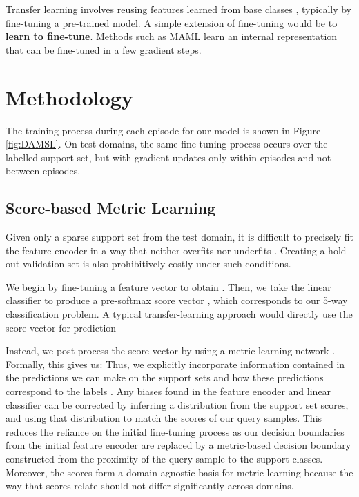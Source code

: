 \documentclass[final]{cvpr}
\begin{document}
Transfer learning involves reusing features learned from base classes \cite{pan2009survey}, typically by fine-tuning a pre-trained model. A simple extension of fine-tuning would be to \textbf{learn to fine-tune}. Methods such as MAML \cite{finn2017model} learn an internal representation that can be fine-tuned in a few gradient steps. 





\section{Methodology}

The training process during each episode for our model is shown in Figure \ref{fig:DAMSL}. On test domains, the same fine-tuning process occurs over the labelled support set, but with gradient updates only within episodes and not between episodes.

\subsection{Score-based Metric Learning}

Given only a sparse support set from the test domain, it is difficult to precisely fit the feature encoder in a way that neither overfits nor underfits \cite{nakamura2019revisiting}. Creating a hold-out validation set is also prohibitively costly under such conditions.  

We begin by fine-tuning a feature vector to obtain . Then, we take the linear classifier  to produce a pre-softmax score vector , which corresponds to our 5-way classification problem. A typical transfer-learning approach would directly use the score vector for prediction 

Instead, we post-process the score vector by using a metric-learning network . Formally, this gives us:  Thus, we explicitly incorporate information contained in the predictions we can make on the support sets  and how these predictions correspond to the labels . Any biases found in the feature encoder  and linear classifier   can be corrected by inferring a distribution from the support set scores, and using that distribution to match the scores of our query samples. This reduces the reliance on the initial fine-tuning process as our decision boundaries from the initial feature encoder are replaced by a metric-based decision boundary constructed from the proximity of the query sample to the support classes. Moreover, the scores form a domain agnostic basis for metric learning because the way that scores relate should not differ significantly across domains.
\end{document}
